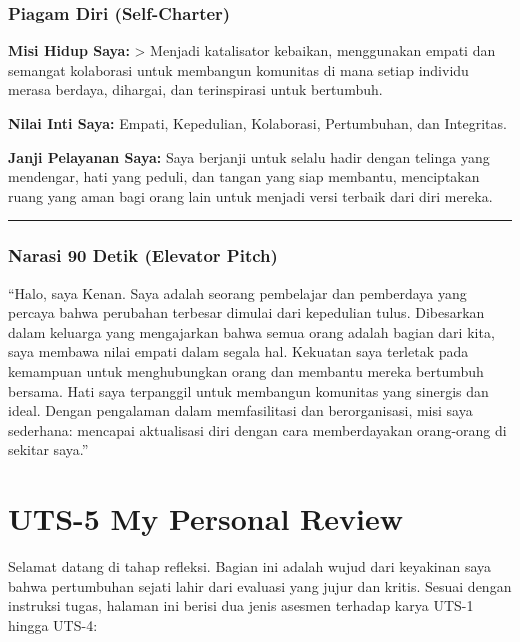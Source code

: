 \documentclass[
  letterpaper,
  DIV=11,
  numbers=noendperiod]{scrreprt}
\begin{document}
\subsection{Piagam Diri (Self-Charter)}\label{piagam-diri-self-charter}

\textbf{Misi Hidup Saya:} \textgreater{} Menjadi katalisator kebaikan,
menggunakan empati dan semangat kolaborasi untuk membangun komunitas di
mana setiap individu merasa berdaya, dihargai, dan terinspirasi untuk
bertumbuh.

\textbf{Nilai Inti Saya:} Empati, Kepedulian, Kolaborasi, Pertumbuhan,
dan Integritas.

\textbf{Janji Pelayanan Saya:} Saya berjanji untuk selalu hadir dengan
telinga yang mendengar, hati yang peduli, dan tangan yang siap membantu,
menciptakan ruang yang aman bagi orang lain untuk menjadi versi terbaik
dari diri mereka.

\begin{center}\rule{0.5\linewidth}{0.5pt}\end{center}

\subsection{Narasi 90 Detik (Elevator
Pitch)}\label{narasi-90-detik-elevator-pitch}

``Halo, saya Kenan. Saya adalah seorang pembelajar dan pemberdaya yang
percaya bahwa perubahan terbesar dimulai dari kepedulian tulus.
Dibesarkan dalam keluarga yang mengajarkan bahwa semua orang adalah
bagian dari kita, saya membawa nilai empati dalam segala hal. Kekuatan
saya terletak pada kemampuan untuk menghubungkan orang dan membantu
mereka bertumbuh bersama. Hati saya terpanggil untuk membangun komunitas
yang sinergis dan ideal. Dengan pengalaman dalam memfasilitasi dan
berorganisasi, misi saya sederhana: mencapai aktualisasi diri dengan
cara memberdayakan orang-orang di sekitar saya.''


\chapter{UTS-5 My Personal Review}\label{uts-5-my-personal-review}

Selamat datang di tahap refleksi. Bagian ini adalah wujud dari keyakinan
saya bahwa pertumbuhan sejati lahir dari evaluasi yang jujur dan kritis.
Sesuai dengan instruksi tugas, halaman ini berisi dua jenis asesmen
terhadap karya UTS-1 hingga UTS-4:
\end{document}
